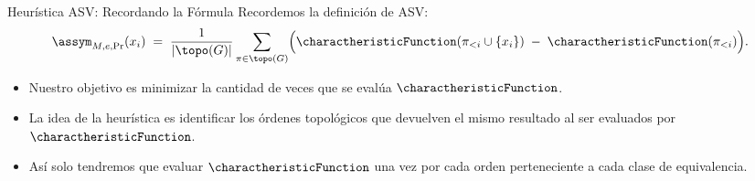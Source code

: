 
\begin{frame}{Heurística ASV: Recordando la Fórmula}
	\small
	Recordemos la definición de ASV:
	\[
	    \assym_{M,e,\Pr}(x_i)
	    \;=\;
	    \frac{1}{|\topo(G)|}\sum_{\pi \in \topo(G)} 
	      \Bigl(\charactheristicFunction(\pi_{<i} \cup \{x_i\})
	      \;-\;\charactheristicFunction(\pi_{<i})\Bigr).
	\]
	\begin{itemize}[<+- | alert@+>]
	    \item Nuestro objetivo es minimizar la cantidad de veces que se evalúa $\charactheristicFunction$.
	    \item La idea de la heurística es identificar los órdenes topológicos que devuelven el mismo resultado al ser evaluados por $\charactheristicFunction$. 
	    \item Así solo tendremos que evaluar $\charactheristicFunction$ una vez por cada orden perteneciente a cada clase de equivalencia. 
	\end{itemize}
\end{frame}

